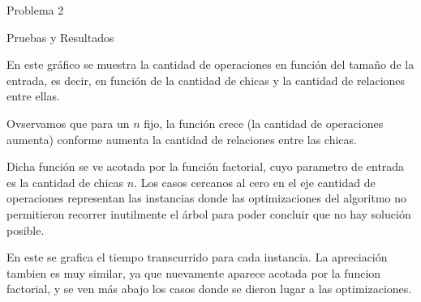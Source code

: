 \begin{section}{Problema 2}
\begin{subsection}{Pruebas y Resultados}
		\newpage

		\VSP

		En este gráfico se muestra la cantidad de operaciones en función del tamaño de la entrada, es decir, en función de la cantidad de chicas y la cantidad de relaciones entre ellas.

		Ovservamos que para un $n$ fijo, la función crece (la cantidad de operaciones aumenta) conforme aumenta la cantidad de relaciones entre las chicas.

		Dicha función se ve acotada por la función factorial, cuyo parametro de entrada es la cantidad de chicas $n$. Los casos cercanos al cero en el eje cantidad de operaciones representan las instancias donde las optimizaciones del algoritmo no permitieron recorrer inutilmente el árbol para poder concluir que no hay solución posible.\VSP

		\newpage

		\VSP

		En este se grafica el tiempo transcurrido para cada instancia. La apreciación tambien es muy similar, ya que nuevamente aparece acotada por la funcion factorial, y se ven más abajo los casos donde se dieron lugar a las optimizaciones.
	\end{subsection}
\end{section}

